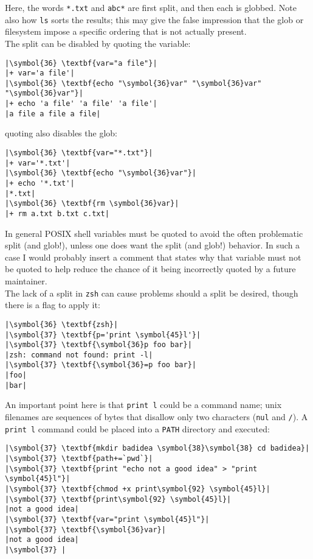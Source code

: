 \documentclass[10pt,a4paper]{article}
\begin{document}
Here, the words \texttt{*.txt} and \texttt{abc*}
are first split, and then each is globbed. Note also how \texttt{ls}
sorts the results; this may give the false impression that the glob or
filesystem impose a specific ordering that is not actually present. \\

The split can be disabled by quoting the variable:

\begin{lstlisting}
|\symbol{36} \textbf{var="a file"}|
|+ var='a file'|
|\symbol{36} \textbf{echo "\symbol{36}var" "\symbol{36}var" "\symbol{36}var"}|
|+ echo 'a file' 'a file' 'a file'|
|a file a file a file|
\end{lstlisting}

quoting also disables the glob:

\begin{lstlisting}
|\symbol{36} \textbf{var="*.txt"}|
|+ var='*.txt'|
|\symbol{36} \textbf{echo "\symbol{36}var"}|
|+ echo '*.txt'|
|*.txt|
|\symbol{36} \textbf{rm \symbol{36}var}|
|+ rm a.txt b.txt c.txt|
\end{lstlisting}

In general POSIX shell variables must be quoted to avoid the often
problematic split (and glob!), unless one does want the split (and
glob!) behavior. In such a case I would probably insert a comment that
states why that variable must not be quoted to help reduce the chance of
it being incorrectly quoted by a future maintainer. \\

The lack of a split in \texttt{zsh} can cause problems should a split be
desired, though there is a flag to apply it:

\begin{lstlisting}
|\symbol{36} \textbf{zsh}|
|\symbol{37} \textbf{p='print \symbol{45}l'}|
|\symbol{37} \textbf{\symbol{36}p foo bar}|
|zsh: command not found: print -l|
|\symbol{37} \textbf{\symbol{36}=p foo bar}|
|foo|
|bar|
\end{lstlisting}

An important point here is that \texttt{print l} could be a
command name; unix filenames are sequences of bytes that disallow only
two characters (\texttt{nul} and \texttt{/}). A \texttt{print
l} command could be placed into a \texttt{PATH} directory
and executed:

\begin{lstlisting}
|\symbol{37} \textbf{mkdir badidea \symbol{38}\symbol{38} cd badidea}|
|\symbol{37} \textbf{path+=`pwd`}|
|\symbol{37} \textbf{print "echo not a good idea" > "print \symbol{45}l"}|
|\symbol{37} \textbf{chmod +x print\symbol{92} \symbol{45}l}|
|\symbol{37} \textbf{print\symbol{92} \symbol{45}l}|
|not a good idea|
|\symbol{37} \textbf{var="print \symbol{45}l"}|
|\symbol{37} \textbf{\symbol{36}var}|
|not a good idea|
|\symbol{37} |
\end{lstlisting}
\end{document}
